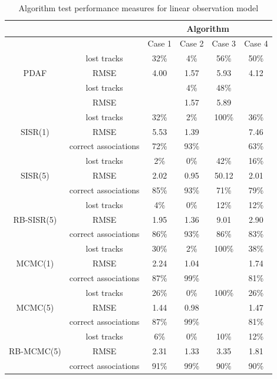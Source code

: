 \begin{table} \centering
\begin{tabular}{|c|c|c|c|c|c|}
\hline
 & & \multicolumn{4}{|c|}{Algorithm} \\
\hline
 & & Case 1 & Case 2 & Case 3 & Case 4 \\
\hline
\multirow{3}{*}{PDAF} & lost tracks             & 32\% & 4\% & 56\% & 50\% \\
                         & RMSE                 & 4.00 & 1.57 & 5.93 & 4.12 \\
\hline
\multirow{3}{*}{JPDAF} & lost tracks            &  & 4\% & 48\% &  \\
                         & RMSE                 &  & 1.57 & 5.89 &  \\
\hline
\multirow{3}{*}{SISR(1)} & lost tracks          & 32\% & 2\% & 100\% & 36\% \\
                         & RMSE                 & 5.53 & 1.39 &  & 7.46 \\
                         & correct associations & 72\% & 93\% &  & 63\% \\
\hline
\multirow{3}{*}{SISR(5)} & lost tracks          & 2\% & 0\% & 42\% & 16\% \\
                         & RMSE                 & 2.02 & 0.95 & 50.12 & 2.01 \\
                         & correct associations & 85\% & 93\% & 71\% & 79\% \\
\hline
\multirow{3}{*}{RB-SISR(5)} & lost tracks       & 4\% & 0\% & 12\% & 12\% \\
                         & RMSE                 & 1.95 & 1.36 & 9.01 & 2.90 \\
                         & correct associations & 86\% & 93\% & 86\% & 83\% \\
\hline
\multirow{3}{*}{MCMC(1)} & lost tracks          & 30\% & 2\% & 100\% & 38\% \\
                         & RMSE                 & 2.24 & 1.04 &  & 1.74 \\
                         & correct associations & 87\% & 99\% &  & 81\% \\
\hline
\multirow{3}{*}{MCMC(5)} & lost tracks          & 26\% & 0\% & 100\% & 26\% \\
                         & RMSE                 & 1.44 & 0.98 &  & 1.47 \\
                         & correct associations & 87\% & 99\% &  & 81\% \\
\hline
\multirow{3}{*}{RB-MCMC(5)} & lost tracks       & 6\% & 0\% & 10\% & 12\% \\
                         & RMSE                 & 2.31 & 1.33 & 3.35 & 1.81 \\
                         & correct associations & 91\% & 99\% & 90\% & 90\% \\
\hline
\end{tabular}
\caption{Algorithm test performance measures for linear observation model}
\label{tab:ResultsLinear}
\end{table}


